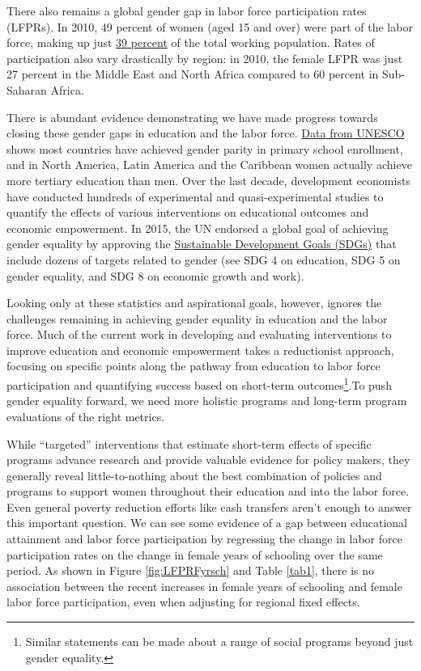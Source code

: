 \documentclass[11pt]{article}
\begin{document}
There also remains a global gender gap in labor force participation rates (LFPRs). In 2010, 49 percent of women (aged 15 and over) were part of the labor force, making up just \href{https://wol.iza.org/articles/female-labor-force-participation-in-developing-countries/long}{39 percent} of the total working population. Rates of participation also vary drastically by region: in 2010, the female LFPR was just 27 percent in the Middle East and North Africa compared to 60 percent in Sub-Saharan Africa. 

There is abundant evidence demonstrating we have made progress towards closing these gender gaps in education and the labor force. \href{https://data.unicef.org/topic/gender/gender-disparities-in-education/}{Data from UNESCO} shows most countries have achieved gender parity in primary school enrollment, and in North America, Latin America and the Caribbean women actually achieve more tertiary education than men. Over the last decade, development economists have conducted hundreds of experimental and quasi-experimental studies to quantify the effects of various interventions on educational outcomes and economic empowerment. In 2015, the UN endorsed a global goal of achieving gender equality by approving the
\href{https://sustainabledevelopment.un.org/}{Sustainable Development Goals (SDGs)} that include dozens of targets related to gender (see SDG 4 on education, SDG 5 on gender equality, and SDG 8 on economic growth and work). 

Looking only at these statistics and aspirational goals, however, ignores the challenges remaining in achieving gender equality in education and the labor force. Much of the current work in developing and evaluating interventions to improve education and economic empowerment takes a reductionist approach, focusing on specific points along the pathway from education to labor force participation and quantifying success based on short-term outcomes\footnote{Similar statements can be made about a range of social programs beyond just gender equality.}.To push gender equality forward, we need more holistic programs and long-term program evaluations of the right metrics. 

While ``targeted'' interventions that estimate short-term effects of specific programs advance research and provide valuable evidence for policy makers, they generally reveal little-to-nothing about the best combination of policies and programs to support women throughout their education and into the labor force. Even general poverty reduction efforts like cash transfers aren't enough to answer this important question. We can see some evidence of a gap between educational attainment and labor force participation by regressing the change in labor force participation rates on the change in female years of schooling over the same period. As shown in Figure \ref{fig:LFPRFyrsch} and Table \ref{tab1}, there is no association between the recent increases in female years of schooling and female labor force participation, even when adjusting for regional fixed effects. 
\end{document}
